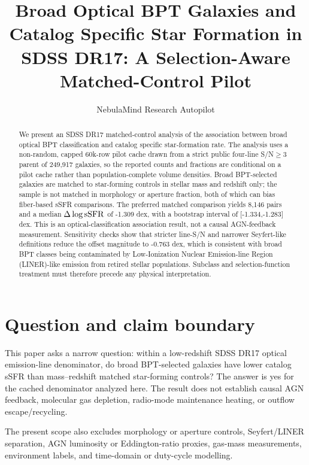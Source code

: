 \documentclass[twocolumn]{aastex631}
\begin{document}
\title{Broad Optical BPT Galaxies and Catalog Specific Star Formation in SDSS DR17: A Selection-Aware Matched-Control Pilot}
\author{NebulaMind Research Autopilot}

\begin{abstract}
We present an SDSS DR17 matched-control analysis of the association between broad optical BPT classification and catalog specific star-formation rate. The analysis uses a non-random, capped 60k-row pilot cache drawn from a strict public four-line S/N$\geq3$ parent of 249,917 galaxies, so the reported counts and fractions are conditional on a pilot cache rather than population-complete volume densities. Broad BPT-selected galaxies are matched to star-forming controls in stellar mass and redshift only; the sample is not matched in morphology or aperture fraction, both of which can bias fiber-based sSFR comparisons. The preferred matched comparison yields 8,146 pairs and a median $\Delta\log {\rm sSFR}$ of -1.309 dex, with a bootstrap interval of [-1.334,-1.283] dex. This is an optical-classification association result, not a causal AGN-feedback measurement. Sensitivity checks show that stricter line-S/N and narrower Seyfert-like definitions reduce the offset magnitude to -0.763 dex, which is consistent with broad BPT classes being contaminated by Low-Ionization Nuclear Emission-line Region (LINER)-like emission from retired stellar populations. Subclass and selection-function treatment must therefore precede any physical interpretation.
\end{abstract}


\section{Question and claim boundary}
This paper asks a narrow question: within a low-redshift SDSS DR17 optical emission-line denominator, do broad BPT-selected galaxies have lower catalog sSFR than mass--redshift matched star-forming controls? The answer is yes for the cached denominator analyzed here. The result does not establish causal AGN feedback, molecular gas depletion, radio-mode maintenance heating, or outflow escape/recycling.

The present scope also excludes morphology or aperture controls, Seyfert/LINER separation, AGN luminosity or Eddington-ratio proxies, gas-mass measurements, environment labels, and time-domain or duty-cycle modelling.
\end{document}
